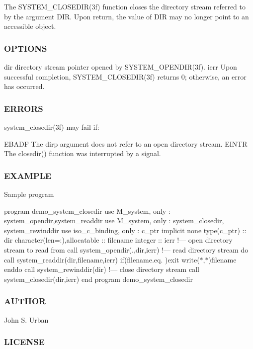 The S\+Y\+S\+T\+E\+M\+\_\+\+C\+L\+O\+S\+E\+D\+I\+R(3f) function closes the directory stream referred to by the argument D\+IR. Upon return, the value of D\+IR may no longer point to an accessible object. \subsubsection*{O\+P\+T\+I\+O\+NS}

dir directory stream pointer opened by S\+Y\+S\+T\+E\+M\+\_\+\+O\+P\+E\+N\+D\+I\+R(3f). ierr Upon successful completion, S\+Y\+S\+T\+E\+M\+\_\+\+C\+L\+O\+S\+E\+D\+I\+R(3f) returns 0; otherwise, an error has occurred. \subsubsection*{E\+R\+R\+O\+RS}

system\+\_\+closedir(3f) may fail if\+:

E\+B\+A\+DF The dirp argument does not refer to an open directory stream. E\+I\+N\+TR The closedir() function was interrupted by a signal. \subsubsection*{E\+X\+A\+M\+P\+LE}

Sample program

program demo\+\_\+system\+\_\+closedir use M\+\_\+system, only \+: system\+\_\+opendir,system\+\_\+readdir use M\+\_\+system, only \+: system\+\_\+closedir, system\+\_\+rewinddir use iso\+\_\+c\+\_\+binding, only \+: c\+\_\+ptr implicit none type(c\+\_\+ptr) \+:\+: dir character(len=\+:),allocatable \+:\+: filename integer \+:\+: ierr !--- open directory stream to read from call system\+\_\+opendir(\textquotesingle{}.\textquotesingle{},dir,ierr) !--- read directory stream do call system\+\_\+readdir(dir,filename,ierr) if(filename.\+eq.\textquotesingle{} \textquotesingle{})exit write($\ast$,$\ast$)filename enddo call system\+\_\+rewinddir(dir) !--- close directory stream call system\+\_\+closedir(dir,ierr) end program demo\+\_\+system\+\_\+closedir \subsubsection*{A\+U\+T\+H\+OR}

John S. Urban \subsubsection*{L\+I\+C\+E\+N\+SE}

